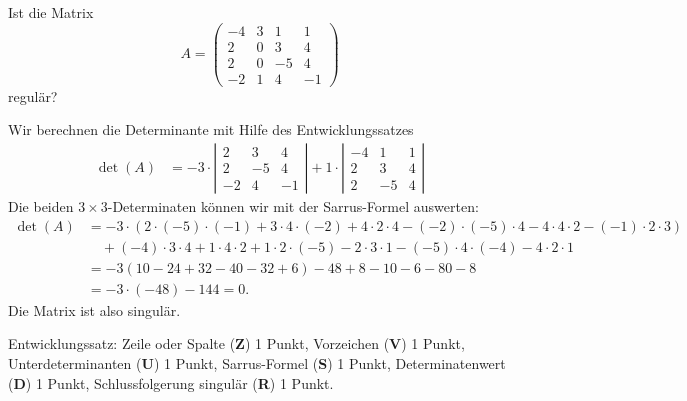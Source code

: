 Ist die Matrix
\[
A=
\begin{pmatrix}
  -4 & 3 & 1 & 1\\
   2 & 0 & 3 & 4\\
   2 & 0 &-5 & 4\\
  -2 & 1 & 4 &-1
\end{pmatrix}
\]
regulär?


\begin{loesung}
Wir berechnen die Determinante mit Hilfe des Entwicklungssatzes
\begin{align*}
\det(A)
&=
-
3\cdot\left|
\begin{matrix}
 2& 3& 4\\
 2&-5& 4\\
-2& 4&-1
\end{matrix}
\right|
+
1\cdot\left|
\begin{matrix}
-4& 1& 1\\
 2& 3& 4\\
 2&-5& 4
\end{matrix}
\right|
\end{align*}
Die beiden $3\times 3$-Determinaten können wir mit der Sarrus-Formel
auswerten:
\begin{align*}
\det(A)
&=
-3\cdot(
2\cdot(-5)\cdot(-1) + 3\cdot 4\cdot(-2)+4\cdot 2\cdot 4
-(-2)\cdot(-5)\cdot 4-4\cdot 4\cdot 2 - (-1)\cdot 2\cdot 3
)
\\
&\quad+
(-4)\cdot 3\cdot 4+1\cdot 4\cdot 2+1\cdot 2\cdot(-5)
-2\cdot 3\cdot 1-(-5)\cdot 4\cdot(-4) -4\cdot 2\cdot 1
\\
&=-3(10-24+32-40-32+6)-48+8-10-6-80-8
\\
&=-3\cdot (-48)-144=0.
\end{align*}
Die Matrix ist also singulär.
\end{loesung}

\begin{bewertung}
Entwicklungssatz: Zeile oder Spalte ({\bf Z}) 1 Punkt,
Vorzeichen ({\bf V}) 1 Punkt,
Unterdeterminanten ({\bf U}) 1 Punkt,
Sarrus-Formel ({\bf S}) 1 Punkt,
Determinatenwert ({\bf D}) 1 Punkt,
Schlussfolgerung singulär ({\bf R}) 1 Punkt.
\end{bewertung}

